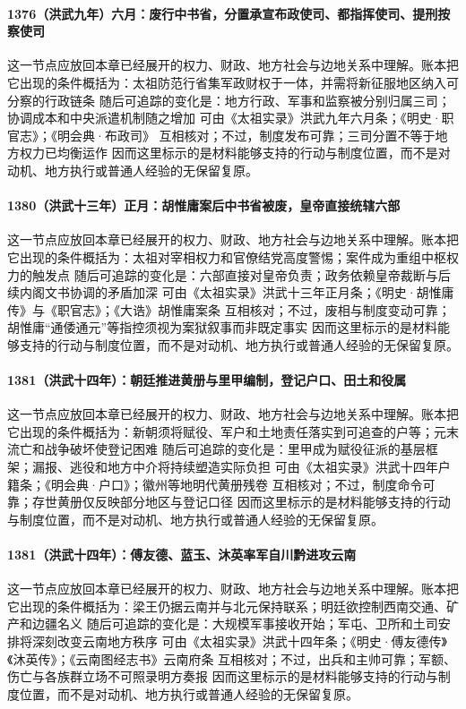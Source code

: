 \paragraph{1376（洪武九年）六月：废行中书省，分置承宣布政使司、都指挥使司、提刑按察使司} 这一节点应放回本章已经展开的权力、财政、地方社会与边地关系中理解。账本把它出现的条件概括为：太祖防范行省集军政财权于一体，并需将新征服地区纳入可分察的行政链条 随后可追踪的变化是：地方行政、军事和监察被分别归属三司；协调成本和中央派遣机制随之增加 可由《太祖实录》洪武九年六月条；《明史·职官志》；《明会典·布政司》 互相核对；不过，制度发布可靠；三司分置不等于地方权力已均衡运作 因而这里标示的是材料能够支持的行动与制度位置，而不是对动机、地方执行或普通人经验的无保留复原。

\paragraph{1380（洪武十三年）正月：胡惟庸案后中书省被废，皇帝直接统辖六部} 这一节点应放回本章已经展开的权力、财政、地方社会与边地关系中理解。账本把它出现的条件概括为：太祖对宰相权力和官僚结党高度警惕；案件成为重组中枢权力的触发点 随后可追踪的变化是：六部直接对皇帝负责；政务依赖皇帝裁断与后续内阁文书协调的矛盾加深 可由《太祖实录》洪武十三年正月条；《明史·胡惟庸传》与《职官志》；《大诰》胡惟庸案条 互相核对；不过，废相与制度变动可靠；胡惟庸“通倭通元”等指控须视为案狱叙事而非既定事实 因而这里标示的是材料能够支持的行动与制度位置，而不是对动机、地方执行或普通人经验的无保留复原。

\paragraph{1381（洪武十四年）：朝廷推进黄册与里甲编制，登记户口、田土和役属} 这一节点应放回本章已经展开的权力、财政、地方社会与边地关系中理解。账本把它出现的条件概括为：新朝须将赋役、军户和土地责任落实到可追查的户等；元末流亡和战争破坏使登记困难 随后可追踪的变化是：里甲成为赋役征派的基层框架；漏报、逃役和地方中介将持续塑造实际负担 可由《太祖实录》洪武十四年户籍条；《明会典·户口》；徽州等地明代黄册残卷 互相核对；不过，制度命令可靠；存世黄册仅反映部分地区与登记口径 因而这里标示的是材料能够支持的行动与制度位置，而不是对动机、地方执行或普通人经验的无保留复原。

\paragraph{1381（洪武十四年）：傅友德、蓝玉、沐英率军自川黔进攻云南} 这一节点应放回本章已经展开的权力、财政、地方社会与边地关系中理解。账本把它出现的条件概括为：梁王仍据云南并与北元保持联系；明廷欲控制西南交通、矿产和边疆名义 随后可追踪的变化是：大规模军事接收开始；军屯、卫所和土司安排将深刻改变云南地方秩序 可由《太祖实录》洪武十四年条；《明史·傅友德传》《沐英传》；《云南图经志书》云南府条 互相核对；不过，出兵和主帅可靠；军额、伤亡与各族群立场不可照录明方奏报 因而这里标示的是材料能够支持的行动与制度位置，而不是对动机、地方执行或普通人经验的无保留复原。


